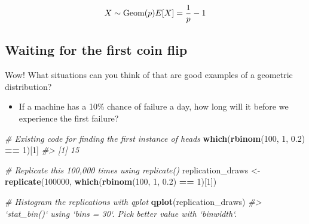 \documentclass[]{article}
\newenvironment{Shaded}{\begin{snugshade}}{\end{snugshade}}
\newcommand{\CommentTok}[1]{\textcolor[rgb]{0.56,0.35,0.01}{\textit{#1}}}
\newcommand{\DecValTok}[1]{\textcolor[rgb]{0.00,0.00,0.81}{#1}}
\newcommand{\FloatTok}[1]{\textcolor[rgb]{0.00,0.00,0.81}{#1}}
\newcommand{\KeywordTok}[1]{\textcolor[rgb]{0.13,0.29,0.53}{\textbf{#1}}}
\newcommand{\NormalTok}[1]{#1}
\newcommand{\OperatorTok}[1]{\textcolor[rgb]{0.81,0.36,0.00}{\textbf{#1}}}
\newcommand{\StringTok}[1]{\textcolor[rgb]{0.31,0.60,0.02}{#1}}
\providecommand{\tightlist}{%
  \setlength{\itemsep}{0pt}\setlength{\parskip}{0pt}}
\begin{document}
\[X \sim \textrm{Geom}(p)\\ E[X] = \frac{1}{p} - 1 \]

\hypertarget{waiting-for-the-first-coin-flip}{%
\subsection{Waiting for the first coin
flip}\label{waiting-for-the-first-coin-flip}}

\begin{Shaded}
\end{Shaded}

Wow! What situations can you think of that are good examples of a
geometric distribution?

\begin{itemize}
\tightlist
\item
  If a machine has a 10\% chance of failure a day, how long will it
  before we experience the first failure?
\end{itemize}

\begin{Shaded}
\begin{Highlighting}[]
\CommentTok{# Existing code for finding the first instance of heads}
\KeywordTok{which}\NormalTok{(}\KeywordTok{rbinom}\NormalTok{(}\DecValTok{100}\NormalTok{, }\DecValTok{1}\NormalTok{, }\FloatTok{0.2}\NormalTok{) }\OperatorTok{==}\StringTok{ }\DecValTok{1}\NormalTok{)[}\DecValTok{1}\NormalTok{]}
\CommentTok{#> [1] 15}

\CommentTok{# Replicate this 100,000 times using replicate()}
\NormalTok{replication_draws <-}\StringTok{ }\KeywordTok{replicate}\NormalTok{(}\DecValTok{100000}\NormalTok{, }\KeywordTok{which}\NormalTok{(}\KeywordTok{rbinom}\NormalTok{(}\DecValTok{100}\NormalTok{, }\DecValTok{1}\NormalTok{, }\FloatTok{0.2}\NormalTok{) }\OperatorTok{==}\StringTok{ }\DecValTok{1}\NormalTok{)[}\DecValTok{1}\NormalTok{])}

\CommentTok{# Histogram the replications with qplot}
\KeywordTok{qplot}\NormalTok{(replication_draws)}
\CommentTok{#> `stat_bin()` using `bins = 30`. Pick better value with `binwidth`.}
\end{Highlighting}
\end{Shaded}
\end{document}
